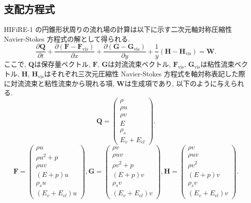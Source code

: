\subsection{支配方程式}
HIFiRE-1 の円錐形状周りの流れ場の計算は以下に示す二次元軸対称圧縮性 Navier-Stokes 方程式の解として得られる.
\begin{equation}
   \dfrac{\partial {\bm Q}}{\partial t}
  +\dfrac{\partial ({\bm F}-{\bm F}_\mathrm{vis})}{\partial x}
  +\dfrac{\partial ({\bm G}-{\bm G}_\mathrm{vis})}{\partial y}
  +\dfrac{1}{y}({\bm H}-{\bm H}_\mathrm{vis})
  ={\bm W}.
  \label{tab:goveq}
\end{equation}
ここで,
${\bm Q}$は保存量ベクトル,
${\bm F}$, ${\bm G}$は対流流束ベクトル,
${\bm F}_\mathrm{vis}$, ${\bm G}_\mathrm{vis}$は粘性流束ベクトル,
${\bm H}$, ${\bm H}_\mathrm{vis}$はそれぞれ三次元圧縮性 Navier-Stokes 方程式を軸対称表記した際に対流流束と粘性流束から現れる項,
${\bm W}$は生成項であり,
以下のように与えられる.
\begin{equation}
  {\bm Q}=
  \begin{pmatrix}
  \rho\\
  \rho u\\
  \rho v\\
  E\\
  \rho_s\\
  E_{v}+E_{el}
  \end{pmatrix}. 
\end{equation}
%
\begin{equation}
  {\bm F}=
  \begin{pmatrix}
  \rho u\\
  \rho u^2+p\\
  \rho u v\\
  (E+p) u\\
  \rho_s u\\
  (E_{v}+E_{el})u
  \end{pmatrix}, 
  {\bm G}=
  \begin{pmatrix}
  \rho v\\
  \rho u v\\
  \rho v^2+p\\
  (E+p) v\\
  \rho_s v\\
  (E_{v}+E_{el})v
  \end{pmatrix},
  {\bm H}=
  \begin{pmatrix}
  \rho v\\
  \rho u v\\
  \rho v^2\\
  (E+p) v\\
  \rho_s v\\
  (E_{v}+E_{el})v  
  \end{pmatrix}.
\end{equation}
